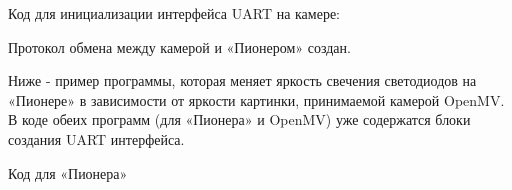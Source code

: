 \documentclass[a4paper,10pt,russian]{sphinxmanual}
\begin{document}
Код для инициализации интерфейса  UART на камере:

%
\begin{sphinxVerbatim}[commandchars=\\\{\}]
  
    
\end{sphinxVerbatim}

Протокол обмена между камерой и «Пионером» создан.

Ниже - пример программы, которая меняет яркость свечения светодиодов на «Пионере» в зависимости от яркости картинки, принимаемой камерой OpenMV.
В коде обеих программ (для «Пионера» и OpenMV) уже содержатся блоки создания UART интерфейса.

Код для «Пионера»
\end{document}
